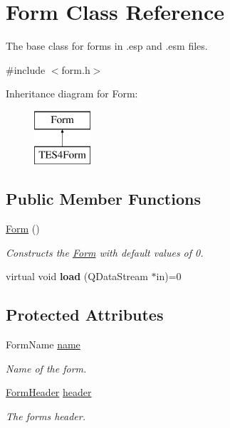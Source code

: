 \hypertarget{class_form}{}\section{Form Class Reference}
\label{class_form}


The base class for forms in .esp and .esm files.  




{\ttfamily \#include $<$form.\+h$>$}

Inheritance diagram for Form\+:\begin{figure}[H]
\begin{center}
\leavevmode
\includegraphics[height=2.000000cm]{class_form}
\end{center}
\end{figure}
\subsection*{Public Member Functions}
\begin{DoxyCompactItemize}
\item 
\hyperlink{class_form_a74d41f789dbfcfd081b241e2c44e576a}{Form} ()
\begin{DoxyCompactList}\small\item\em Constructs the \hyperlink{class_form}{Form} with default values of 0. \end{DoxyCompactList}\item 
\mbox{\label{class_form_a4c68e6dfae9d8674fc9a55bfa9be34e3}} 
virtual void {\bfseries load} (Q\+Data\+Stream $\ast$in)=0
\end{DoxyCompactItemize}
\subsection*{Protected Attributes}
\begin{DoxyCompactItemize}
\item 
Form\+Name \hyperlink{class_form_a3a19912be281bc3e9c99911bb70e0f4b}{name}
\begin{DoxyCompactList}\small\item\em Name of the form. \end{DoxyCompactList}\item 
\hyperlink{struct_form_header}{Form\+Header} \hyperlink{class_form_a6aec4c07386c72bb12947f7766562856}{header}
\begin{DoxyCompactList}\small\item\em The form\textquotesingle{}s header. \end{DoxyCompactList}\end{DoxyCompactItemize}


